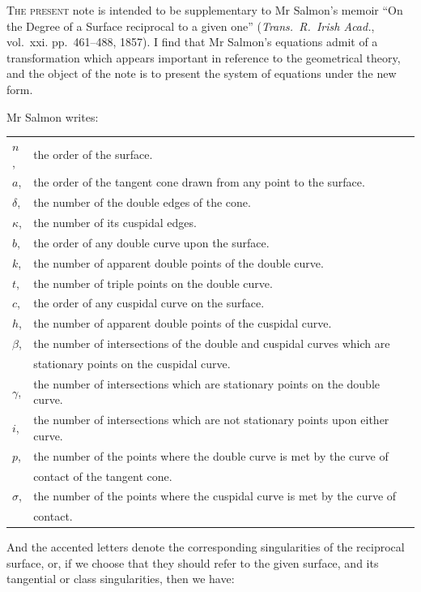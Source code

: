 \documentclass[11pt,a4paper]{book}
\begin{document}
\bigskip

\textsc{The present} note is intended to be supplementary to Mr Salmon's memoir ``On the Degree of a Surface reciprocal to a given one'' (\textit{Trans.\ R.\ Irish Acad.}, vol.~xxi. pp.~461--488, 1857). I find that Mr Salmon's equations admit of a transformation which appears important in reference to the geometrical theory, and the object of the note is to present the system of equations under the new form.

Mr Salmon writes:

\begin{tabular}{@{}ll@{}}
$n$, & the order of the surface. \\
$a$, & the order of the tangent cone drawn from any point to the surface. \\
$\delta$, & the number of the double edges of the cone. \\
$\kappa$, & the number of its cuspidal edges. \\
$b$, & the order of any double curve upon the surface. \\
$k$, & the number of apparent double points of the double curve. \\
$t$, & the number of triple points on the double curve. \\
$c$, & the order of any cuspidal curve on the surface. \\
$h$, & the number of apparent double points of the cuspidal curve. \\
$\beta$, & the number of intersections of the double and cuspidal curves which are \\
 & \quad stationary points on the cuspidal curve. \\
$\gamma$, & the number of intersections which are stationary points on the double curve. \\
$i$, & the number of intersections which are not stationary points upon either curve. \\
$p$, & the number of the points where the double curve is met by the curve of \\
 & \quad contact of the tangent cone. \\
$\sigma$, & the number of the points where the cuspidal curve is met by the curve of \\
 & \quad contact. \\
\end{tabular}

And the accented letters denote the corresponding singularities of the reciprocal surface, or, if we choose that they should refer to the given surface, and its tangential or class singularities, then we have:
\end{document}
